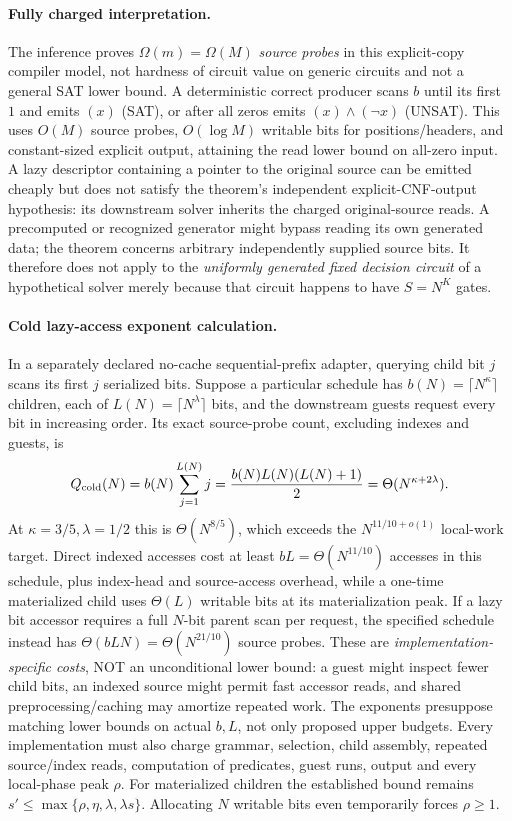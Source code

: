 \documentclass[11pt]{article}
\begin{document}
\paragraph{Fully charged interpretation.}
The inference proves $\Omega(m)=\Omega(M)$ \emph{source probes} in this explicit-copy compiler model, not hardness of circuit value on generic circuits and not a general SAT lower bound.
A deterministic correct producer scans $b$ until its first $1$ and emits $(x)$ (SAT), or after all zeros emits $(x)\wedge(\neg x)$ (UNSAT).
This uses $O(M)$ source probes, $O(\log M)$ writable bits for positions/headers, and constant-sized explicit output, attaining the read lower bound on all-zero input.
A lazy descriptor containing a pointer to the original source can be emitted cheaply but does not satisfy the theorem's independent explicit-CNF-output hypothesis: its downstream solver inherits the charged original-source reads.
A precomputed or recognized generator might bypass reading its own generated data; the theorem concerns arbitrary independently supplied source bits.
It therefore does not apply to the \emph{uniformly generated fixed decision circuit} of a hypothetical solver merely because that circuit happens to have $S=N^K$ gates.

\paragraph{Cold lazy-access exponent calculation.}
In a separately declared no-cache sequential-prefix adapter, querying child bit $j$ scans its first $j$ serialized bits.
Suppose a particular schedule has $b(N)=\lceil N^{\kappa}\rceil$ children, each of $L(N)=\lceil N^\lambda\rceil$ bits, and the downstream guests request every bit in increasing order.
Its exact source-probe count, excluding indexes and guests, is
\[
Q_{\rm cold}(N)=b(N)\sum_{j=1}^{L(N)}j
=\frac{b(N)L(N)(L(N)+1)}{2}
=\Theta(N^{\kappa+2\lambda}).
\]
At $\kappa=3/5,\lambda=1/2$ this is $\Theta(N^{8/5})$, which exceeds the $N^{11/10+o(1)}$ local-work target.
Direct indexed accesses cost at least $bL=\Theta(N^{11/10})$ accesses in this schedule, plus index-head and source-access overhead, while a one-time materialized child uses $\Theta(L)$ writable bits at its materialization peak.
If a lazy bit accessor requires a full $N$-bit parent scan per request, the specified schedule instead has $\Theta(bLN)=\Theta(N^{21/10})$ source probes.
These are \emph{implementation-specific costs}, NOT an unconditional lower bound: a guest might inspect fewer child bits, an indexed source might permit fast accessor reads, and shared preprocessing/caching may amortize repeated work. The exponents presuppose matching lower bounds on actual $b,L$, not only proposed upper budgets.
Every implementation must also charge grammar, selection, child assembly, repeated source/index reads, computation of predicates, guest runs, output and every local-phase peak $\rho$.
For materialized children the established bound remains $s'\le\max\{\rho,\eta,\lambda,\lambda s\}$.
Allocating $N$ writable bits even temporarily forces $\rho\ge1$.
\end{document}
